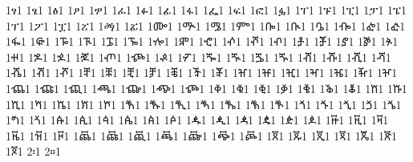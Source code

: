 {1ፃ1 %
1ፄ1 %
1ፅ1 %
1ፆ1 %
1ፇ1 %
1ፈ1 %
1ፉ1 %
1ፊ1 %
1ፋ1 %
1ፌ1 %
1ፍ1 %
1ፎ1 %
1ፏ1 %
1ፐ1 %
1ፑ1 %
1ፒ1 %
1ፓ1 %
1ፔ1 %
1ፕ1 %
1ፖ1 %
1ፗ1 %
1ፘ1 %
1ፙ1 %
1ፚ1 %
1ᎀ1 %
1ᎁ1 %
1ᎂ1 %
1ᎃ1 %
1ᎄ1 %
1ᎅ1 %
1ᎆ1 %
1ᎇ1 %
1ᎈ1 %
1ᎉ1 %
1ᎊ1 %
1ᎋ1 %
1ᎌ1 %
1ᎍ1 %
1ᎎ1 %
1ᎏ1 %
1ⶀ1 %
1ⶁ1 %
1ⶂ1 %
1ⶃ1 %
1ⶄ1 %
1ⶅ1 %
1ⶆ1 %
1ⶇ1 %
1ⶈ1 %
1ⶉ1 %
1ⶊ1 %
1ⶋ1 %
1ⶌ1 %
1ⶍ1 %
1ⶎ1 %
1ⶏ1 %
1ⶐ1 %
1ⶑ1 %
1ⶒ1 %
1ⶓ1 %
1ⶔ1 %
1ⶕ1 %
1ⶖ1 %
1ⶠ1 %
1ⶡ1 %
1ⶢ1 %
1ⶣ1 %
1ⶤ1 %
1ⶥ1 %
1ⶦ1 %
1ⶨ1 %
1ⶩ1 %
1ⶪ1 %
1ⶫ1 %
1ⶬ1 %
1ⶭ1 %
1ⶮ1 %
1ⶰ1 %
1ⶱ1 %
1ⶲ1 %
1ⶳ1 %
1ⶴ1 %
1ⶵ1 %
1ⶶ1 %
1ⶸ1 %
1ⶹ1 %
1ⶺ1 %
1ⶻ1 %
1ⶼ1 %
1ⶽ1 %
1ⶾ1 %
1ⷀ1 %
1ⷁ1 %
1ⷂ1 %
1ⷃ1 %
1ⷄ1 %
1ⷅ1 %
1ⷆ1 %
1ⷈ1 %
1ⷉ1 %
1ⷊ1 %
1ⷋ1 %
1ⷌ1 %
1ⷍ1 %
1ⷎ1 %
1ⷐ1 %
1ⷑ1 %
1ⷒ1 %
1ⷓ1 %
1ⷔ1 %
1ⷕ1 %
1ⷖ1 %
1ⷘ1 %
1ⷙ1 %
1ⷚ1 %
1ⷛ1 %
1ⷜ1 %
1ⷝ1 %
1ⷞ1 %
1ꬁ1 %
1ꬂ1 %
1ꬃ1 %
1ꬄ1 %
1ꬅ1 %
1ꬆ1 %
1ꬉ1 %
1ꬊ1 %
1ꬋ1 %
1ꬌ1 %
1ꬍ1 %
1ꬎ1 %
1ꬑ1 %
1ꬒ1 %
1ꬓ1 %
1ꬔ1 %
1ꬕ1 %
1ꬖ1 %
1ꬠ1 %
1ꬡ1 %
1ꬢ1 %
1ꬣ1 %
1ꬤ1 %
1ꬥ1 %
1ꬦ1 %
1ꬨ1 %
1ꬩ1 %
1ꬪ1 %
1ꬫ1 %
1ꬬ1 %
1ꬭ1 %
1ꬮ1 %
2፡1 %
2።1 %
}
